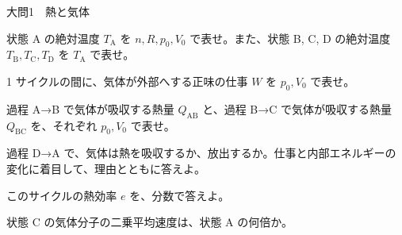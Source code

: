 \documentclass[paper=b5, fontsize=8pt, fleqn, twoside]{jlreq}
\begin{document}
\begin{ascolorbox4A}[75点・30分]{大問1　熱と気体}
\begin{minipage}[t]{0.37\linewidth}
\end{minipage}
\begin{qlist}[resume*=sa]
\item 状態 A の絶対温度 $T_\mathrm{A}$ を $n,R,p_0,V_0$ で表せ。また、状態 B, C, D の絶対温度 $T_\mathrm{B},T_\mathrm{C},T_\mathrm{D}$ を $T_\mathrm{A}$ で表せ。
\item 1 サイクルの間に、気体が外部へする正味の仕事 $W$ を $p_0,V_0$ で表せ。
\item 過程 A→B で気体が吸収する熱量 $Q_\mathrm{AB}$ と、過程 B→C で気体が吸収する熱量 $Q_\mathrm{BC}$ を、それぞれ $p_0,V_0$ で表せ。
\item 過程 D→A で、気体は熱を吸収するか、放出するか。仕事と内部エネルギーの変化に着目して、理由とともに答えよ。
\item このサイクルの熱効率 $e$ を、分数で答えよ。
\item 状態 C の気体分子の二乗平均速度は、状態 A の何倍か。
\end{qlist}
\end{ascolorbox4A}
\end{document}

